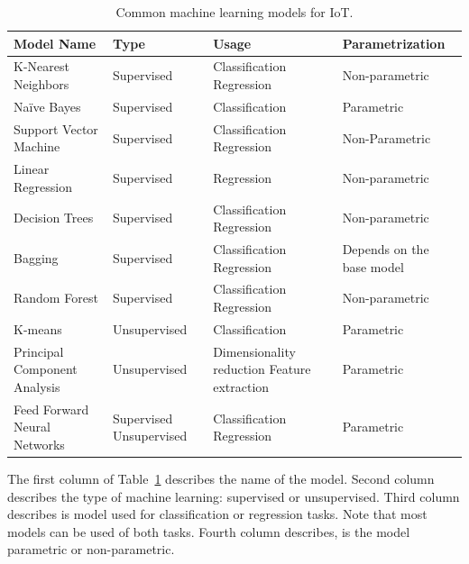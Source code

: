 \documentclass[english, 12pt, a4paper, elec, utf8, online]{aaltothesis}
\begin{document}
\begin{table}[h!]
\caption{Common machine learning models for IoT.} \label{tab:common_model_iot}
\begin{center}
\begin{tabular}{ |p{4cm}|p{2.5cm}|p{2.5cm}|p{3.2cm}| } 
\hline
\textbf{Model Name} & \textbf{Type} & \textbf{Usage}  & \textbf{Parametrization} \\
\hline
K-Nearest Neighbors & Supervised & Classification Regression  & Non-parametric \\ 
\hline 
 Naïve Bayes & Supervised & Classification & Parametric \\ 
\hline
Support Vector Machine & Supervised  & Classification Regression & Non-Parametric  \\ 
\hline 
Linear Regression  & Supervised  & Regression & Non-parametric  \\
\hline
Decision Trees  & Supervised  & Classification Regression & Non-parametric \\
\hline
Bagging  & Supervised  & Classification Regression & Depends on the base model  \\ 
\hline
Random Forest  & Supervised  & Classification Regression & Non-parametric   \\
\hline
K-means  & Unsupervised  & Classification & Parametric  \\
\hline
Principal Component Analysis  & Unsupervised  & Dimensionality reduction Feature extraction & Parametric  \\
\hline
Feed Forward Neural Networks  & Supervised Unsupervised  & Classification Regression & Parametric  \\
\hline   
\end{tabular}
\end{center}
\end{table}

The first column of Table~\ref{tab:common_model_iot} describes the name of the model. Second column describes the type of machine learning: supervised or unsupervised. Third column describes is model used for classification or regression tasks. Note that most models can be used of both tasks. Fourth column describes, is the model parametric or non-parametric.
\end{document}
